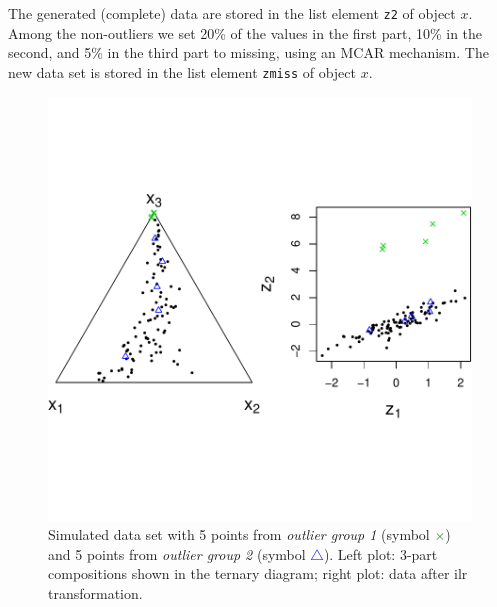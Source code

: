 \documentclass{scrartcl}\usepackage[]{graphicx}\usepackage[]{color}
\begin{document}
The generated (complete) data are stored in the list element \texttt{z2}
of object $x$. Among the non-outliers we set 20\% of the values in the first
part, 10\% in the second, and 5\% in the third part to missing, using an
MCAR mechanism. The new data set is stored in the list element \texttt{zmiss} of object $x$.




 







\begin{figure}[h]
\begin{center}
\vspace*{-3cm}
\includegraphics{plot-acomp}  
\vspace*{-33mm}
\caption{Simulated data set with 5 points from
\textit{outlier group 1} (symbol \textcolor{green}{$\times$}) 
and 5 points from \textit{outlier group 2} 
(symbol \textcolor{blue}{$\triangle$}).
Left plot: 3-part compositions shown in the ternary diagram;
right plot: data after ilr transformation.}
\label{repFig1}
\end{center}
\end{figure}
\end{document}
